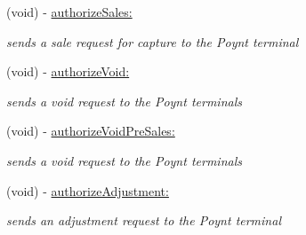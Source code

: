 \begin{DoxyCompactItemize}
(void) -\/ \hyperlink{interface_poynt_p_o_s_connection_manager_addc8717b201139753094f0d5d9038ea9}{authorize\+Sales\+:}
\begin{DoxyCompactList}\small\item\em sends a sale request for capture to the Poynt terminal \end{DoxyCompactList}\item 
(void) -\/ \hyperlink{interface_poynt_p_o_s_connection_manager_ac78262b676405ba3826f79c55c488e1f}{authorize\+Void\+:}
\begin{DoxyCompactList}\small\item\em sends a void request to the Poynt terminals \end{DoxyCompactList}\item 
(void) -\/ \hyperlink{interface_poynt_p_o_s_connection_manager_a9dbf19579902ee4c67310a2d705381b9}{authorize\+Void\+Pre\+Sales\+:}
\begin{DoxyCompactList}\small\item\em sends a void request to the Poynt terminals \end{DoxyCompactList}\item 
(void) -\/ \hyperlink{interface_poynt_p_o_s_connection_manager_a5a35b99719ec02d91ec102d75a49bd7a}{authorize\+Adjustment\+:}
\begin{DoxyCompactList}\small\item\em sends an adjustment request to the Poynt terminal \end{DoxyCompactList}\end{DoxyCompactItemize}
